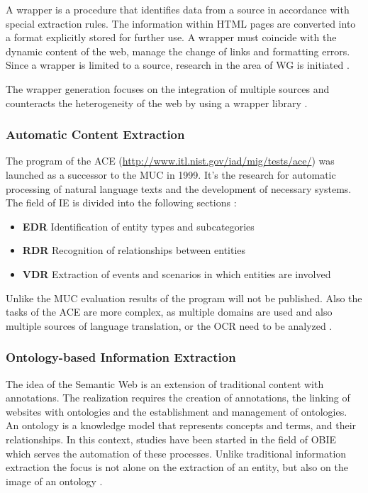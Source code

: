 A wrapper is a procedure that identifies data from a source in accordance with special extraction rules. The information within HTML pages are converted into a format explicitly stored for further use. A wrapper must coincide with the dynamic content of the web, manage the change of links and formatting errors. Since a wrapper is limited to a source, research in the area of \gls{WG} is initiated \cite{Chang:2006}\cite{Eikvil:1999}.

The wrapper generation focuses on the integration of multiple sources and counteracts the heterogeneity of the web by using a wrapper library \cite{Siefkes:2007}\cite{Turmo:2006}.

\subsubsection{Automatic Content Extraction}
The program of the \gls{ACE} (\url{http://www.itl.nist.gov/iad/mig/tests/ace/})  was launched as a successor to the \gls{MUC} in 1999. It's the  research for automatic processing of natural language texts and the development of necessary systems. The field of \gls{IE} is divided into the following sections \cite{Nist:2008}\cite{Lavelli:2008}\cite{Turmo:2006}\cite{Linsmayr:2010}:

\begin{itemize}
\item \textbf{\gls{EDR}} \newline
Identification of entity types and subcategories
\item \textbf{\gls{RDR}} \newline
Recognition of relationships between entities
\item \textbf{\gls{VDR}} \newline
Extraction of events and scenarios in which entities are involved
\end{itemize}

Unlike the \gls{MUC} evaluation results of the program will not be published. Also the tasks of the \gls{ACE} are more complex, as multiple domains are used and also multiple sources of language translation, or the \gls{OCR} need to be analyzed \cite{Cunningham:2005}.

\subsubsection{Ontology-based Information Extraction}
The idea of the Semantic Web is an extension of traditional content with annotations. The realization requires the creation of annotations, the linking of websites with ontologies and the establishment and management of ontologies. An ontology is a knowledge model that represents concepts and terms, and their relationships. In this context, studies have been started in the field of \gls{OBIE} which serves the automation of these processes. Unlike traditional information extraction the focus is not alone on the extraction of an entity, but also on the image of an ontology \cite{Cunningham:2005}\cite{Maynard:2005}\cite{Weinhofer:2010}\cite{Linsmayr:2010}.

